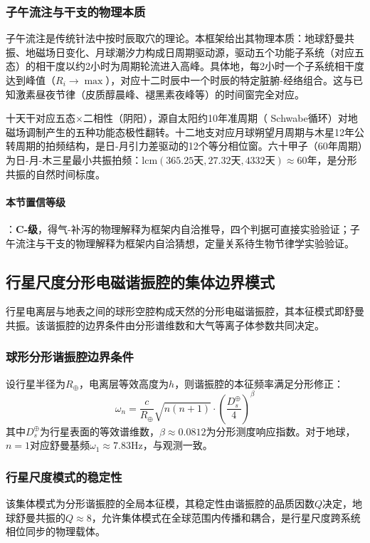 \documentclass[12pt,a4paper,twocolumn]{article}
\begin{document}
\subsubsection{子午流注与干支的物理本质}
\label{subsec:ziwu_liuzhu}
子午流注是传统针法中按时辰取穴的理论。本框架给出其物理本质：地球舒曼共振、地磁场日变化、月球潮汐力构成日周期驱动源，驱动五个功能子系统（对应五态）的相干度以约2小时为周期轮流进入高峰。具体地，每2小时一个子系统相干度达到峰值（$R_i\to\max$），对应十二时辰中一个时辰的特定脏腑-经络组合。这与已知激素昼夜节律（皮质醇晨峰、褪黑素夜峰等）的时间窗完全对应。

十天干对应五态$\times$二相性（阴阳），源自太阳约10年准周期（ Schwabe循环）对地磁场调制产生的五种功能态极性翻转。十二地支对应月球朔望月周期与木星12年公转周期的拍频结构，是日-月引力差驱动的12个等分相位窗。六十甲子（60年周期）为日-月-木三星最小共振拍频：$\text{lcm}(365.25\text{天}, 27.32\text{天}, 4332\text{天})\approx60$年，是分形共振的自然时间标度。

\paragraph{本节置信等级}：\textbf{C-级}，得气-补泻的物理解释为框架内自洽推导，四个判据可直接实验验证；子午流注与干支的物理解释为框架内自洽猜想，定量关系待生物节律学实验验证。


\subsection{行星尺度分形电磁谐振腔的集体边界模式}
\label{subsec:planetary_cavity}
行星电离层与地表之间的球形空腔构成天然的分形电磁谐振腔，其本征模式即舒曼共振。该谐振腔的边界条件由分形谱维数和大气等离子体参数共同决定。

\subsubsection{球形分形谐振腔边界条件}
设行星半径为$R_\oplus$，电离层等效高度为$h$，则谐振腔的本征频率满足分形修正：
\begin{equation}
\omega_n = \frac{c}{R_\oplus} \sqrt{n(n+1)} \cdot \left( \frac{D_s^\oplus}{4} \right)^\beta
\end{equation}
其中$D_s^\oplus$为行星表面的等效谱维数，$\beta\approx0.0812$为分形测度响应指数。对于地球，$n=1$对应舒曼基频$\omega_1\approx7.83$Hz，与观测一致。

\subsubsection{行星尺度模式的稳定性}
该集体模式为分形谐振腔的全局本征模，其稳定性由谐振腔的品质因数$Q$决定，地球舒曼共振的$Q\approx8$，允许集体模式在全球范围内传播和耦合，是行星尺度跨系统相位同步的物理载体。
\end{document}
